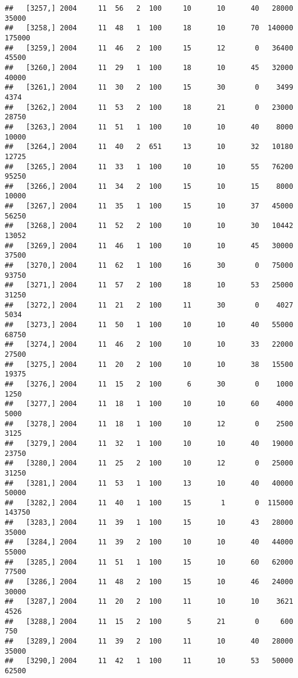 \documentclass{article}\usepackage[]{graphicx}\usepackage[]{color}
\makeatletter
\newenvironment{kframe}{%
 \def\at@end@of@kframe{}%
 \ifinner\ifhmode%
  \def\at@end@of@kframe{\end{minipage}}%
  \begin{minipage}{\columnwidth}%
 \fi\fi%
 \def\FrameCommand##1{\hskip\@totalleftmargin \hskip-\fboxsep
 \colorbox{shadecolor}{##1}\hskip-\fboxsep
     \hskip-\linewidth \hskip-\@totalleftmargin \hskip\columnwidth}%
 \MakeFramed {\advance\hsize-\width
   \@totalleftmargin\z@ \linewidth\hsize
   \@setminipage}}%
 {\par\unskip\endMakeFramed%
 \at@end@of@kframe}
\newenvironment{knitrout}{}{} %
\makeatother
\begin{document}
\begin{knitrout}
\begin{kframe}
\begin{verbatim}
##   [3257,] 2004     11  56   2  100     10      10      40   28000   35000
##   [3258,] 2004     11  48   1  100     18      10      70  140000  175000
##   [3259,] 2004     11  46   2  100     15      12       0   36400   45500
##   [3260,] 2004     11  29   1  100     18      10      45   32000   40000
##   [3261,] 2004     11  30   2  100     15      30       0    3499    4374
##   [3262,] 2004     11  53   2  100     18      21       0   23000   28750
##   [3263,] 2004     11  51   1  100     10      10      40    8000   10000
##   [3264,] 2004     11  40   2  651     13      10      32   10180   12725
##   [3265,] 2004     11  33   1  100     10      10      55   76200   95250
##   [3266,] 2004     11  34   2  100     15      10      15    8000   10000
##   [3267,] 2004     11  35   1  100     15      10      37   45000   56250
##   [3268,] 2004     11  52   2  100     10      10      30   10442   13052
##   [3269,] 2004     11  46   1  100     10      10      45   30000   37500
##   [3270,] 2004     11  62   1  100     16      30       0   75000   93750
##   [3271,] 2004     11  57   2  100     18      10      53   25000   31250
##   [3272,] 2004     11  21   2  100     11      30       0    4027    5034
##   [3273,] 2004     11  50   1  100     10      10      40   55000   68750
##   [3274,] 2004     11  46   2  100     10      10      33   22000   27500
##   [3275,] 2004     11  20   2  100     10      10      38   15500   19375
##   [3276,] 2004     11  15   2  100      6      30       0    1000    1250
##   [3277,] 2004     11  18   1  100     10      10      60    4000    5000
##   [3278,] 2004     11  18   1  100     10      12       0    2500    3125
##   [3279,] 2004     11  32   1  100     10      10      40   19000   23750
##   [3280,] 2004     11  25   2  100     10      12       0   25000   31250
##   [3281,] 2004     11  53   1  100     13      10      40   40000   50000
##   [3282,] 2004     11  40   1  100     15       1       0  115000  143750
##   [3283,] 2004     11  39   1  100     15      10      43   28000   35000
##   [3284,] 2004     11  39   2  100     10      10      40   44000   55000
##   [3285,] 2004     11  51   1  100     15      10      60   62000   77500
##   [3286,] 2004     11  48   2  100     15      10      46   24000   30000
##   [3287,] 2004     11  20   2  100     11      10      10    3621    4526
##   [3288,] 2004     11  15   2  100      5      21       0     600     750
##   [3289,] 2004     11  39   2  100     11      10      40   28000   35000
##   [3290,] 2004     11  42   1  100     11      10      53   50000   62500

\end{verbatim}
\end{kframe}
\end{knitrout}
\end{document}
